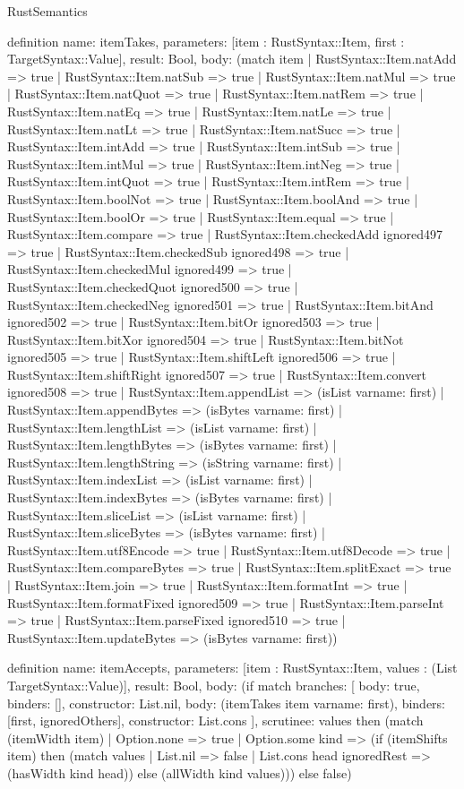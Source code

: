 \begin{lexlean}{RustSemantics}
\begin{semanticmodule}
definition{
  name: itemTakes,
  parameters: [item : RustSyntax::Item, first : TargetSyntax::Value],
  result: Bool,
  body: (match item
    | RustSyntax::Item.natAdd => true
    | RustSyntax::Item.natSub => true
    | RustSyntax::Item.natMul => true
    | RustSyntax::Item.natQuot => true
    | RustSyntax::Item.natRem => true
    | RustSyntax::Item.natEq => true
    | RustSyntax::Item.natLe => true
    | RustSyntax::Item.natLt => true
    | RustSyntax::Item.natSucc => true
    | RustSyntax::Item.intAdd => true
    | RustSyntax::Item.intSub => true
    | RustSyntax::Item.intMul => true
    | RustSyntax::Item.intNeg => true
    | RustSyntax::Item.intQuot => true
    | RustSyntax::Item.intRem => true
    | RustSyntax::Item.boolNot => true
    | RustSyntax::Item.boolAnd => true
    | RustSyntax::Item.boolOr => true
    | RustSyntax::Item.equal => true
    | RustSyntax::Item.compare => true
    | RustSyntax::Item.checkedAdd ignored497 => true
    | RustSyntax::Item.checkedSub ignored498 => true
    | RustSyntax::Item.checkedMul ignored499 => true
    | RustSyntax::Item.checkedQuot ignored500 => true
    | RustSyntax::Item.checkedNeg ignored501 => true
    | RustSyntax::Item.bitAnd ignored502 => true
    | RustSyntax::Item.bitOr ignored503 => true
    | RustSyntax::Item.bitXor ignored504 => true
    | RustSyntax::Item.bitNot ignored505 => true
    | RustSyntax::Item.shiftLeft ignored506 => true
    | RustSyntax::Item.shiftRight ignored507 => true
    | RustSyntax::Item.convert ignored508 => true
    | RustSyntax::Item.appendList => (isList var{name: first})
    | RustSyntax::Item.appendBytes => (isBytes var{name: first})
    | RustSyntax::Item.lengthList => (isList var{name: first})
    | RustSyntax::Item.lengthBytes => (isBytes var{name: first})
    | RustSyntax::Item.lengthString => (isString var{name: first})
    | RustSyntax::Item.indexList => (isList var{name: first})
    | RustSyntax::Item.indexBytes => (isBytes var{name: first})
    | RustSyntax::Item.sliceList => (isList var{name: first})
    | RustSyntax::Item.sliceBytes => (isBytes var{name: first})
    | RustSyntax::Item.utf8Encode => true
    | RustSyntax::Item.utf8Decode => true
    | RustSyntax::Item.compareBytes => true
    | RustSyntax::Item.splitExact => true
    | RustSyntax::Item.join => true
    | RustSyntax::Item.formatInt => true
    | RustSyntax::Item.formatFixed ignored509 => true
    | RustSyntax::Item.parseInt => true
    | RustSyntax::Item.parseFixed ignored510 => true
    | RustSyntax::Item.updateBytes => (isBytes var{name: first}))
}

definition{
  name: itemAccepts,
  parameters: [item : RustSyntax::Item, values : (List TargetSyntax::Value)],
  result: Bool,
  body: (if match{
    branches: [
      {body: true, binders: [], constructor: List.nil},
      {
        body: (itemTakes item var{name: first}),
        binders: [first, ignoredOthers],
        constructor: List.cons
      }
    ],
    scrutinee: values
  } then (match (itemWidth item)
    | Option.none => true
    | Option.some kind => (if (itemShifts item) then (match values
      | List.nil => false
      | List.cons head ignoredRest => (hasWidth kind head)) else (allWidth kind values))) else false)
}


\end{semanticmodule}
\end{lexlean}
